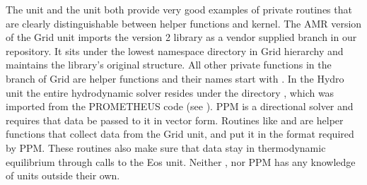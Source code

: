 The  unit and the  unit both provide very good
examples of private routines that are clearly distinguishable between
helper functions and kernel. The AMR version of the \unit{Grid} unit imports
the \Paramesh version 2 library as a vendor supplied branch in our repository. It
sits under the lowest namespace directory  in \unit{Grid}
hierarchy and maintains the library's original structure. All other
private functions in the  branch of \unit{Grid} are helper
functions and their names start with . In the \unit{Hydro} unit the
entire hydrodynamic solver resides under the directory ,
which was imported from the PROMETHEUS code (see ). 
PPM is a directional
solver and requires that data be passed to it in vector form. Routines
like  and  are helper functions that
collect data from the \unit{Grid} unit, and put it in the format required by
PPM. These routines also make sure that data stay in thermodynamic
equilibrium through calls to the Eos unit. Neither , nor PPM
has any knowledge of units outside their own. 









